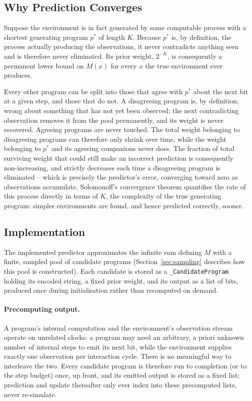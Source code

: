 \documentclass[11pt]{article}
\begin{document}
\subsection{Why Prediction Converges}
\label{sec:convergence}

Suppose the environment is in fact generated by some computable process with a shortest
generating program $p^\ast$ of length $K$. Because $p^\ast$ is, by definition, the process
actually producing the observations, it never contradicts anything seen and is therefore
never eliminated. Its prior weight, $2^{-K}$, is consequently a permanent lower bound on
$M(x)$ for every $x$ the true environment ever produces.

Every other program can be split into those that agree with $p^\ast$ about the next bit at
a given step, and those that do not. A disagreeing program is, by definition, wrong about
something that has not yet been observed; the next contradicting observation removes it
from the pool permanently, and its weight is never recovered. Agreeing programs are never
touched. The total weight belonging to disagreeing programs can therefore only shrink over
time, while the weight belonging to $p^\ast$ and its agreeing companions never does. The
fraction of total surviving weight that could still make an incorrect prediction is
consequently non-increasing, and strictly decreases each time a disagreeing program is
eliminated -- which is precisely the predictor's error, converging toward zero as
observations accumulate. Solomonoff's convergence theorem quantifies the rate of this
process directly in terms of $K$, the complexity of the true generating program: simpler
environments are found, and hence predicted correctly, sooner.

\subsection{Implementation}

The implemented predictor approximates the infinite sum defining $M$ with a finite,
sampled pool of candidate programs (Section~\ref{sec:sampling} describes how this pool is
constructed). Each candidate is stored as a \texttt{\_CandidateProgram} holding its
encoded string, a fixed prior weight, and its output as a list of bits, produced once
during initialisation rather than recomputed on demand.

\paragraph{Precomputing output.} A program's internal computation and the environment's
observation stream operate on unrelated clocks: a program may need an arbitrary, a priori
unknown number of internal steps to emit its next bit, while the environment supplies
exactly one observation per interaction cycle. There is no meaningful way to interleave
the two. Every candidate program is therefore run to completion (or to the step budget)
once, up front, and its emitted output is stored as a fixed list; prediction and update
thereafter only ever index into these precomputed lists, never re-simulate.
\end{document}
